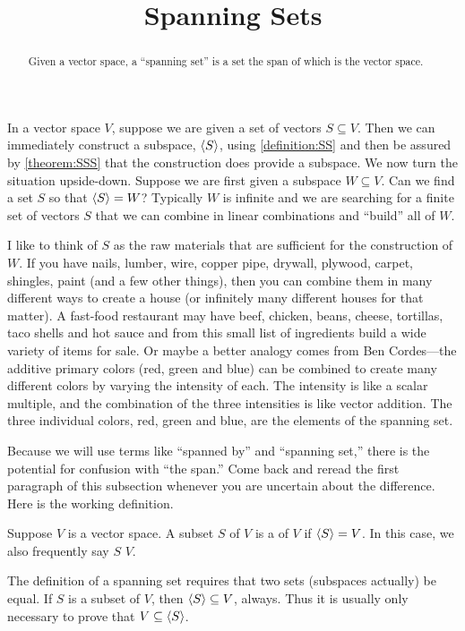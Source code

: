 \documentclass{ximera}
\title{Spanning Sets}
\begin{document}
\begin{abstract}
  Given a vector space, a ``spanning set'' is a set the span of which is the vector space.
\end{abstract}
\maketitle

In a vector space $V$, suppose we are given a set of vectors
$S\subseteq V$.  Then we can immediately construct a subspace,
$\left\langle S\right\rangle$, using \ref{definition:SS} and then be assured by
\ref{theorem:SSS} that the construction does provide a subspace.  We
now turn the situation upside-down.  Suppose we are first given a
subspace $W\subseteq V$.  Can we find a set $S$ so that $\left\langle S\right\rangle=W$?
Typically $W$ is infinite and we are searching for a finite set of
vectors $S$ that we can combine in linear combinations and ``build''
all of $W$.

I like to think of $S$ as the raw materials that are sufficient for
the construction of $W$.  If you have nails, lumber, wire, copper
pipe, drywall, plywood, carpet, shingles, paint (and a few other
things), then you can combine them in many different ways to create a
house (or infinitely many different houses for that matter).  A
fast-food restaurant may have beef, chicken, beans, cheese, tortillas,
taco shells and hot sauce and from this small list of ingredients
build a wide variety of items for sale.  Or maybe a better analogy
comes from Ben Cordes---the additive primary colors (red, green and
blue) can be combined to create many different colors by varying the
intensity of each.  The intensity is like a scalar multiple, and the
combination of the three intensities is like vector addition.  The
three individual colors, red, green and blue, are the elements of the
spanning set.

Because we will use terms like ``spanned by'' and ``spanning set,''
there is the potential for confusion with ``the span.''  Come back and
reread the first paragraph of this subsection whenever you are
uncertain about the difference.  Here is the working definition.

\begin{definition}
  Suppose $V$ is a vector space.  A subset $S$ of $V$ is a
   of $V$ if $\left\langle S\right\rangle=V$.  In this case, we also
  frequently say $S$  $V$.
\end{definition}

The definition of a spanning set requires that two sets (subspaces
actually) be equal.  If $S$ is a subset of $V$, then
$\left\langle S\right\rangle\subseteq V$, always.  Thus it is usually only necessary to
prove that $V\subseteq\left\langle S\right\rangle$.
\end{document}
